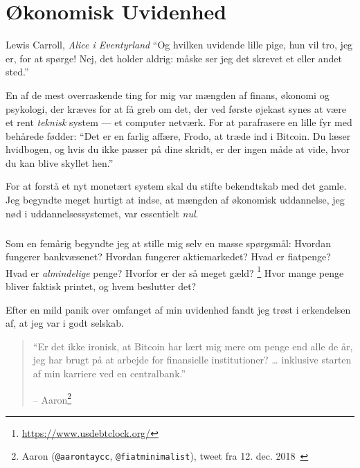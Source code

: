 \chapter{Økonomisk Uvidenhed}
\label{les:8}

\begin{chapquote}{Lewis Carroll, \textit{Alice i Eventyrland}}
\enquote{Og hvilken uvidende lille pige, hun vil tro, jeg er, for at spørge! 
Nej, det holder aldrig: måske ser jeg det skrevet et eller andet sted.}
\end{chapquote}

En af de mest overraskende ting for mig var mængden af finans, økonomi og
psykologi, der kræves for at få greb om det, der ved første øjekast synes at 
være et rent \textit{teknisk} system --- et computer netværk. For at 
parafrasere en lille fyr med behårede fødder: \enquote{Det er en farlig 
affære, Frodo, at træde ind i Bitcoin. Du læser hvidbogen, og hvis du ikke 
passer på dine skridt, er der ingen måde at vide, hvor du kan blive skyllet 
hen.}

For at forstå et nyt monetært system skal du stifte bekendtskab med det gamle. 
Jeg begyndte meget hurtigt at indse, at mængden af økonomisk uddannelse, jeg 
nød i uddannelsessystemet, var essentielt \textit{nul}.

\paragraph{}
Som en femårig begyndte jeg at stille mig selv en masse spørgsmål: Hvordan 
fungerer bankvæsenet? Hvordan fungerer aktiemarkedet? Hvad er fiatpenge? Hvad 
er \textit{almindelige} penge? Hvorfor er der så meget gæld?
\footnote{\url{https://www.usdebtclock.org/}} Hvor mange penge bliver faktisk
printet, og hvem beslutter det?

\newpage

Efter en mild panik over omfanget af min uvidenhed fandt jeg trøst i 
erkendelsen af, at jeg var i godt selskab.

\begin{quotation}\begin{samepage}
\enquote{Er det ikke ironisk, at Bitcoin har lært mig mere om penge end alle 
de år, jeg har brugt på at arbejde for finansielle institutioner? \ldots 
inklusive starten af min karriere ved en centralbank.}
\begin{flushright} -- Aaron\footnote{Aaron (\texttt{@aarontaycc}, 
    \texttt{@fiatminimalist}), tweet fra 12. dec. 2018~\cite{aarontaycc-tweet}}
\end{flushright}\end{samepage}\end{quotation}


